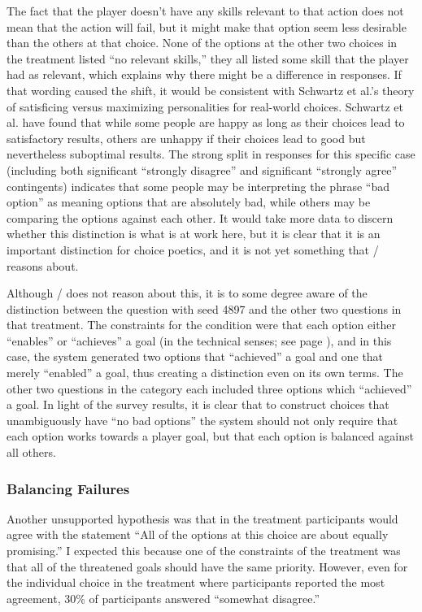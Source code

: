 The fact that the player doesn't have any skills relevant to that action does not mean that the action will fail, but it might make that option seem less desirable than the others at that choice.
%
None of the options at the other two choices in the \rlx{} treatment listed ``no relevant skills,'' they all listed some skill that the player had as relevant, which explains why there might be a difference in responses.
%
If that wording caused the shift, it would be consistent with Schwartz et al.'s theory of satisficing versus maximizing personalities \citep{Schwartz2002} for real-world choices.
%
Schwartz et al. have found that while some people are happy as long as their choices lead to satisfactory results, others are unhappy if their choices lead to good but nevertheless suboptimal results.
%
The strong split in responses for this specific case (including both significant ``strongly disagree'' and significant ``strongly agree'' contingents) indicates that some people may be interpreting the phrase ``bad option'' as meaning options that are absolutely bad, while others may be comparing the options against each other.
%
It would take more data to discern whether this distinction is what is at work here, but it is clear that it is an important distinction for choice poetics, and it is not yet something that \dunyazad/ reasons about.


Although \dunyazad/ does not reason about this, it is to some degree aware of the distinction between the question with seed 4897 and the other two questions in that treatment.
%
The constraints for the \rlx{} condition were that each option either ``enables'' or ``achieves'' a goal (in the technical senses; see page \pageref{page:choicetypes}), and in this case, the system generated two options that ``achieved'' a goal and one that merely ``enabled'' a goal, thus creating a distinction even on its own terms.
%
The other two questions in the \rlx{} category each included three options which ``achieved'' a goal.
%
In light of the survey results, it is clear that to construct choices that unambiguously have ``no bad options'' the system should not only require that each option works towards a player goal, but that each option is balanced against all others.


\subsubsection{Balancing Failures}

Another unsupported hypothesis was that in the \dlm{} treatment participants would agree with the statement ``All of the options at this choice are about equally promising.''
%
I expected this because one of the constraints of the \dlm{} treatment was that all of the threatened goals should have the same priority.
%
However, even for the individual choice in the \dlm{} treatment where participants reported the most agreement, 30\% of participants answered ``somewhat disagree.'' 


